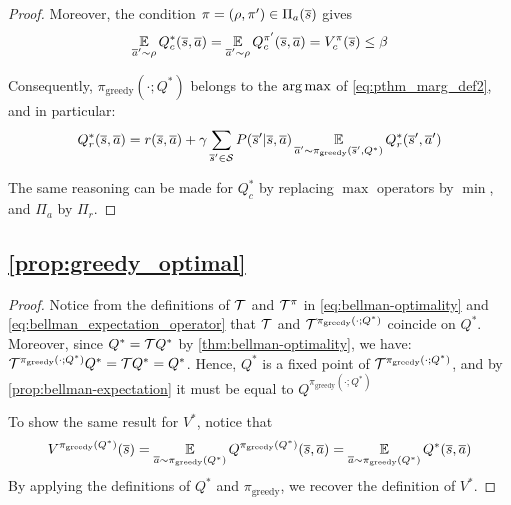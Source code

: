 \begin{proof}
Moreover, the condition $\pi=(\rho, \pi')\in\Pi_a(\overline{s})$ gives
\begin{equation*}
   \operatorname*{\mathbb{E}}\limits_{\overline{a}'\sim\rho} Q_c^{*}(\overline{s}, \overline{a}) = \operatorname*{\mathbb{E}}\limits_{\overline{a}'\sim\rho} Q_c^{\pi'}(\overline{s}, \overline{a}) = V_c^{\pi}(\overline{s}) \leq \beta
\end{equation*}

Consequently, $\pi_\text{greedy}(\cdot; Q^*)$ belongs to the $\operatorname*{arg\,max}$ of \eqref{eq:pthm_marg_def2}, and in particular:
\begin{equation*}
     Q_r^*(\overline{s}, \overline{a}) = r(\overline{s}, \overline{a}) + \gamma \sum_{\overline{s}'\in\mathcal{S}}  P(\overline{s}' | \overline{s}, \overline{a}) \operatorname*{\mathbb{E}}\limits_{\overline{a}'\sim\pi_\text{greedy}(\overline{s}', Q^*)} Q_r^*(\overline{s}', \overline{a}')
\end{equation*}

The same reasoning can be made for $Q_c^*$ by replacing $\max$ operators by $\min$, and $\Pi_a$ by $\Pi_r$.
\end{proof}


\subsection{\autoref{prop:greedy_optimal}}
\begin{proof}
Notice from the definitions of $\mathcal{T}$ and $\mathcal{T}^\pi$ in \eqref{eq:bellman-optimality} and \eqref{eq:bellman_expectation_operator} that $\mathcal{T}$ and $\mathcal{T}^{\pi_\text{greedy}(\cdot;Q^*)}$ coincide on $Q^*$. Moreover, since $Q^* = \mathcal{T} Q^*$ by \autoref{thm:bellman-optimality}, we have: $    \mathcal{T}^{\pi_\text{greedy}(\cdot;Q^*)} Q^* = \mathcal{T} Q^* = Q^*
$.
Hence, $Q^*$ is a fixed point of $\mathcal{T}^{\pi_\text{greedy}(\cdot;Q^*)}$, and by \autoref{prop:bellman-expectation} it must be equal to $Q^{\pi_\text{greedy}(\cdot;Q^*)}$

To show the same result for $V^*$, notice that 
\begin{equation*}
    V^{\pi_\text{greedy}(Q^*)}(\overline{s}) = \operatorname*{\mathbb{E}}\limits_{\overline{a}\sim\pi_\text{greedy}(Q^*)}Q^{\pi_\text{greedy}(Q^*)}(\overline{s},\overline{a}) = \operatorname*{\mathbb{E}}\limits_{\overline{a}\sim\pi_\text{greedy}(Q^*)}Q^*(\overline{s},\overline{a})
\end{equation*}
By applying the definitions of $Q^*$ and $\pi_\text{greedy}$, we recover the definition of $V^*$.
\end{proof}

